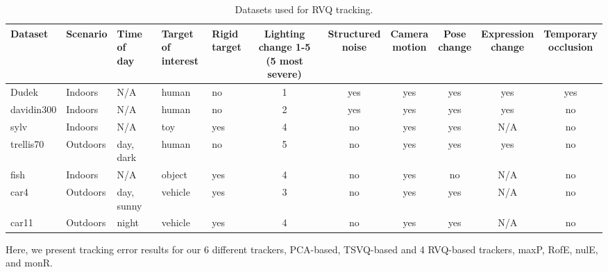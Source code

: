 \begin{Body}
\begin{table}[t]
\footnotesize
\begin{tabular}{p{0.6in}|p{0.6in}p{0.6in}p{0.4in}p{0.4in}cccccc}
Dataset 		&Scenario	     &\parbox[c]{0.4in}{\center Time of \\day} 	&\parbox[c]{0.26in}{\center Target of \\interest}  &\parbox{0.3in}{\center Rigid \\target} 	&\parbox{0.4in}{\center Lighting change 1-5 \\(5 most severe)}  	&\parbox{0.5in}{\center Structured \\noise} 	&\parbox{0.4in}{\center Camera \\motion} 	&\parbox{0.3in}{\center Pose \\change} 	&\parbox{0.45in}{\center Expression \\change} 	&\parbox{0.3in}{\center Temporary \\occlusion} 	\\\hline
Dudek 			&Indoors 	     &N/A 			&human 					&no 	&1 	&yes 	&yes 	&yes 	&yes 	&yes 		\\\hline
davidin300 	&Indoors		&N/A			&human					&no	&2	&yes	&yes	&yes	&yes	&no		\\\hline
sylv				&Indoors		&N/A			&toy						&yes	&4	&no	&yes	&yes	&N/A	&no		\\\hline
trellis70	 		&Outdoors 		&day, dark		&human					&no	&5	&no	&yes	&yes	&yes	&no		\\\hline
fish				&Indoors		&N/A			&object					&yes	&4	&no	&yes	&no	&N/A	&no		\\\hline
car4			&Outdoors 		&day, sunny	&vehicle					&yes	&3	&no	&yes	&yes	&N/A	&no		\\\hline
car11			&Outdoors		&night			&vehicle					&yes	&4	&no	&yes	&yes	&N/A	&no		\\\hline
\end{tabular}
\caption{Datasets used for RVQ tracking.}
\label{Tab:datasets_used}
\end{table}

Here, we present tracking error results for our 6 different trackers, PCA-based, TSVQ-based and 4 RVQ-based trackers, maxP, RofE, nulE, and monR.



\end{Body}

